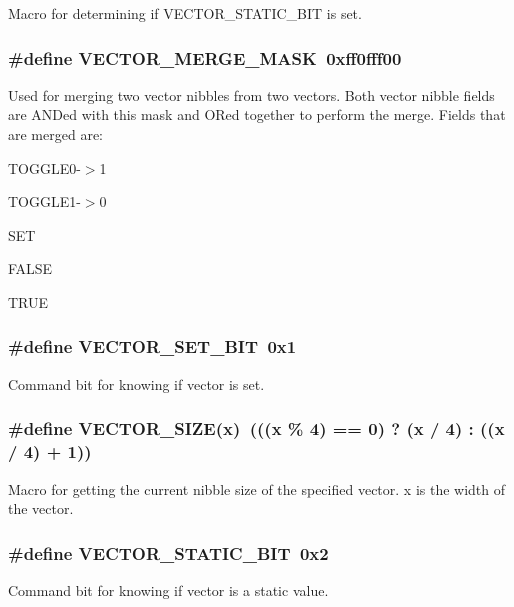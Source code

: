 Macro for determining if VECTOR\_\-STATIC\_\-BIT is set. 
\subsubsection{\setlength{\rightskip}{0pt plus 5cm}\#define VECTOR\_\-MERGE\_\-MASK\ 0xff0fff00}\label{group__vector__defs_a5}


Used for merging two vector nibbles from two vectors. Both vector nibble fields are ANDed with this mask and ORed together to perform the merge.  Fields that are merged are:\begin{CompactItemize}
\item 
TOGGLE0-$>$1\item 
TOGGLE1-$>$0\item 
SET\item 
FALSE\item 
TRUE \end{CompactItemize}
\subsubsection{\setlength{\rightskip}{0pt plus 5cm}\#define VECTOR\_\-SET\_\-BIT\ 0x1}\label{group__vector__defs_a0}


Command bit for knowing if vector is set. 
\subsubsection{\setlength{\rightskip}{0pt plus 5cm}\#define VECTOR\_\-SIZE(x)\ (((x \% 4) == 0) ? (x / 4) : ((x / 4) + 1))}\label{group__vector__defs_a4}


Macro for getting the current nibble size of the specified vector. x is the width of the vector. 
\subsubsection{\setlength{\rightskip}{0pt plus 5cm}\#define VECTOR\_\-STATIC\_\-BIT\ 0x2}\label{group__vector__defs_a1}


Command bit for knowing if vector is a static value. 